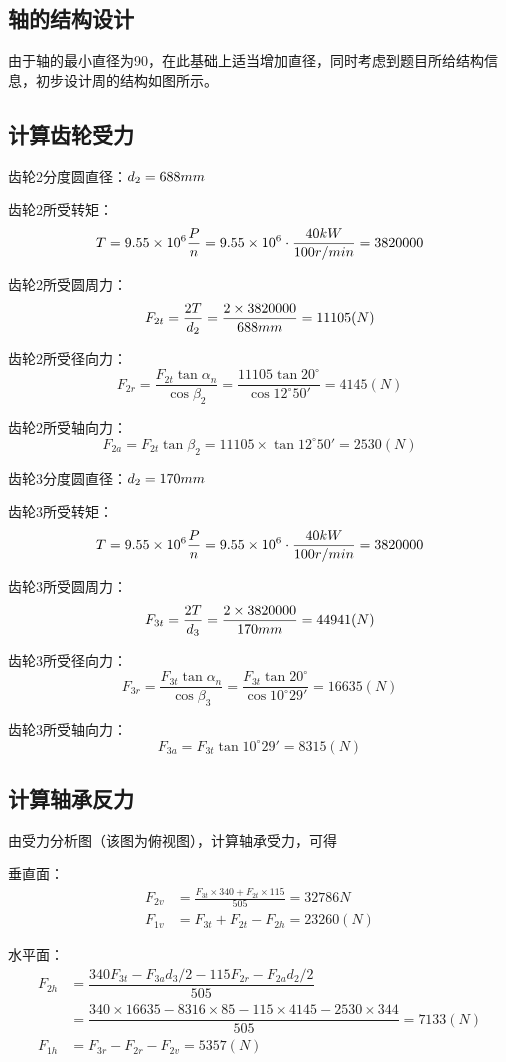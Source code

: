 	\subsection{轴的结构设计}
	由于轴的最小直径为90，在此基础上适当增加直径，同时考虑到题目所给结构信息，初步设计周的结构如图所示。

	\subsection{计算齿轮受力}
	齿轮2分度圆直径：$d_2 = 688mm$

	齿轮2所受转矩：$$T = 9.55\times 10^6\dfrac{P}{n} = 9.55\times 10^6\cdot\dfrac{40kW}{100r/min} = 3820000 $$
	\newcommand{\myT}{3820000}

	齿轮2所受圆周力：
	$$F_{2t} = \dfrac{2T}{d_2} = \dfrac{2\times\myT}{\myda} = 11105(N)$$

	齿轮2所受径向力：
	$$F_{2r} = \dfrac{F_{2t}\tan \alpha_n}{\cos\beta_2} = \dfrac{11105\tan 20^\circ}{\cos 12^\circ 50'} = 4145(N) $$

	齿轮2所受轴向力：
	$$F_{2a} = F_{2t}\tan \beta_2 = 11105\times\tan 12^\circ 50' = 2530(N)$$

	齿轮3分度圆直径：$d_2 = 170mm$
	
	齿轮3所受转矩：
	$$T = 9.55\times 10^6\dfrac{P}{n} = 9.55\times 10^6\cdot\dfrac{40kW}{100r/min} = 3820000 $$

	齿轮3所受圆周力：
	$$F_{3t} = \dfrac{2T}{d_3} = \dfrac{2\times\myT}{\mydb} = 44941(N)$$

	齿轮3所受径向力：
	$$F_{3r} = \dfrac{F_{3t}\tan \alpha_n}{\cos\beta_3} = \dfrac{F_{3t}\tan 20^\circ}{\cos10^\circ 29'} = 16635(N) $$

	齿轮3所受轴向力：
	$$F_{3a} = F_{3t}\tan 10^\circ 29' = 8315(N)$$

	\subsection{计算轴承反力}

	由受力分析图（该图为俯视图），计算轴承受力，可得

	垂直面：
	\begin{align}
		F_{2v} &= \frac{F_{3t}\times 340 + F_{2t}\times 115}{505} = 32786N\\
		F_{1v} &= F_{3t} + F_{2t} - F_{2h} = 23260(N)
	\end{align}

	水平面：
	\begin{align}
		F_{2h} &= \dfrac{340F_{3t}-F_{3a}d_3/2-115F_{2r}-F_{2a}d_2/2}{505} \\
		&= \dfrac{340\times 16635-8316\times 85-115\times 4145-2530\times 344}{505} = 7133(N) \\
		F_{1h} &= F_{3r} - F_{2r} - F_{2v} = 5357(N)
	\end{align}
